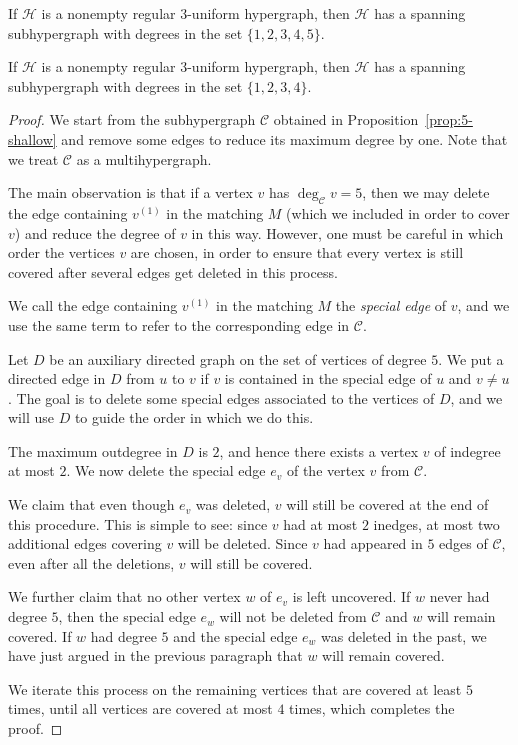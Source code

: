 \documentclass[10pt,a4paper]{amsart}
\def\cC{\mathcal{C}}
\def\cH{\mathcal{H}}
\begin{document}
\begin{proposition}\label{prop:5-shallow}
If $\cH$ is a nonempty regular $3$-uniform hypergraph, then $\cH$ has a spanning subhypergraph with degrees in the set $\{1, 2, 3, 4, 5\}$.
\end{proposition}

\begin{proposition}\label{prop:4-shallow}
If $\cH$ is a nonempty regular $3$-uniform hypergraph, then $\cH$ has a spanning subhypergraph with degrees in the set $\{1, 2, 3, 4\}$.
\end{proposition}

\begin{proof}
We start from the subhypergraph $\cC$ obtained in Proposition~\ref{prop:5-shallow} and remove some edges to reduce its maximum degree by one. Note that we treat $\cC$ as a multihypergraph.

The main observation is that if a vertex $v$ has $\deg_{\cC}v=5$, then we may delete the edge containing $v^{(1)}$ in the matching $M$ (which we included in order to cover $v$) and reduce the degree of $v$ in this way. However, one must be careful in which order the vertices $v$ are chosen, in order to ensure that every vertex is still covered after several edges get deleted in this process.

We call the edge containing $v^{(1)}$ in the matching $M$ the \textit{special edge} of $v$, and we use the same term to refer to the corresponding edge in $\cC$.

Let $D$ be an auxiliary directed graph on the set of vertices of degree $5$. We put a directed edge in $D$ from $u$ to $v$ if $v$ is contained in the special edge of $u$ and $v\neq u$. The goal is to delete some special edges associated to the vertices of $D$, and we will use $D$ to guide the order in which we do this.

The maximum outdegree in $D$ is $2$, and hence there exists a vertex $v$ of indegree at most $2$. We now delete the special edge $e_v$ of the vertex $v$ from $\cC$. 

We claim that even though $e_v$ was deleted, $v$ will still be covered at the end of this procedure. This is simple to see: since $v$ had at most $2$ inedges, at most two additional edges covering $v$ will be deleted. Since $v$ had appeared in $5$ edges of $\cC$, even after all the deletions, $v$ will still be covered. 

We further claim that no other vertex $w$ of $e_v$ is left uncovered. If $w$ never had degree $5$, then the special edge $e_w$ will not be deleted from $\cC$ and $w$ will remain covered. If $w$ had degree $5$ and the special edge $e_w$ was deleted in the past, we have just argued in the previous paragraph that $w$ will remain covered.

We iterate this process on the remaining vertices that are covered at least $5$ times, until all vertices are covered at most $4$ times, which completes the proof.
\end{proof}
\end{document}
